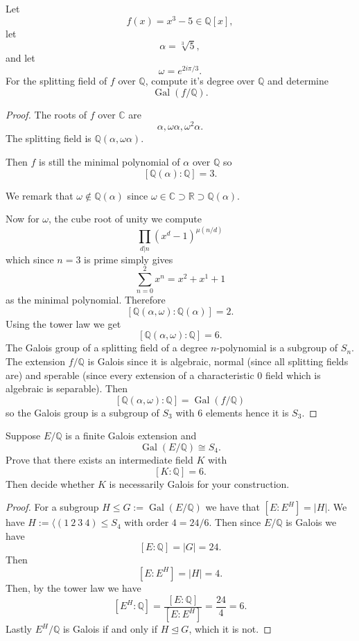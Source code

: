 \begin{prob}
    Let  
    \[
        f(x) = x^3 - 5 \in \mathbb Q[x], 
    \]
    let 
    \[
        \alpha = \sqrt[3]5, 
    \]
    and let 
    \[
        \omega = e^{2i\pi/3}. 
    \]
    For the splitting field of $f$ over 
    $\mathbb Q$, compute it's degree over 
    $\mathbb Q$ and determine 
    \[
        \operatorname{Gal}(f/\mathbb Q).
    \]
\end{prob}
\begin{proof}
    The roots of $f$ over $\mathbb C$ are 
    \[
        \alpha, \omega \alpha, \omega^2 \alpha. 
    \]
    The splitting field is 
    $\mathbb Q(\alpha, \omega\alpha)$.

    Then $f$ is still the minimal polynomial of 
    $\alpha$ over $\mathbb Q$ so 
    \[
        [\mathbb Q(\alpha) : \mathbb Q] = 3. 
    \]

    We remark that $\omega \not\in \mathbb Q(\alpha)$ since 
    $\omega \in \mathbb C \supset \mathbb R \supset \mathbb Q(\alpha)$. 

    Now for $\omega$, the cube root of unity we compute 
    \[
        \prod_{d|n} (x^d - 1)^{\mu(n/d)}  
    \]
    which since $n = 3$ is prime simply gives 
    \[
        \sum_{n=0}^2 x^n = x^2 + x^1 + 1 
    \]
    as the minimal polynomial. 
    Therefore 
    \[
        [\mathbb Q(\alpha, \omega) : \mathbb Q(\alpha)]
        = 2. 
    \]
    Using the tower law we get 
    \[
        [\mathbb Q(\alpha,\omega): \mathbb Q] = 6. 
    \]
    The Galois group of a splitting field of 
    a degree $n$-polynomial is a subgroup of 
    $S_n$. The extension $f/\mathbb Q$ is Galois since 
    it is algebraic, normal (since all splitting fields are) and 
    sperable (since every extension of a characteristic $0$ field 
    which is algebraic is separable). 
    Then 
    \[
        [\mathbb Q(\alpha, \omega) : \mathbb Q] = 
        \operatorname{Gal}(f/\mathbb Q)
    \]
    so the Galois group is a subgroup of $S_3$ with 
    $6$ elements hence it is $S_3$.
\end{proof}

\begin{prob}
    Suppose $E/\mathbb Q$ is a finite Galois extension and 
    \[
        \operatorname{Gal}(E/\mathbb Q) \cong S_4.
    \]
    Prove that there exists an intermediate field $K$ with 
    \[
        [K : \mathbb Q] = 6. 
    \]
    Then decide whether $K$ is necessarily Galois 
    for your construction. 
\end{prob}
\begin{proof}
    For a subgroup $H \leq G := \operatorname{Gal}(E/\mathbb Q)$  
    we have that $[E:E^H] = |H|$. 
    We have $H:= \langle (1 \ 2 \ 3 \ 4) \leq S_4$ with 
    order $4 = 24/6$. Then since $E/\mathbb Q$ is 
    Galois we have
    \[
        [E : \mathbb Q] = |G| = 24. 
    \]
    Then 
    \[
        [E:E^{H}] = |H| = 4. 
    \]
    Then, by the tower law we have 
    \[
        [E^{H}:\mathbb Q] 
        = \frac{[E:\mathbb Q]}{[E:E^H]} = \frac{24}{4} = 6.
    \]
    Lastly $E^H/\mathbb Q$ is Galois if and only if 
    $H \trianglelefteq G$, which it is not. 
\end{proof}


